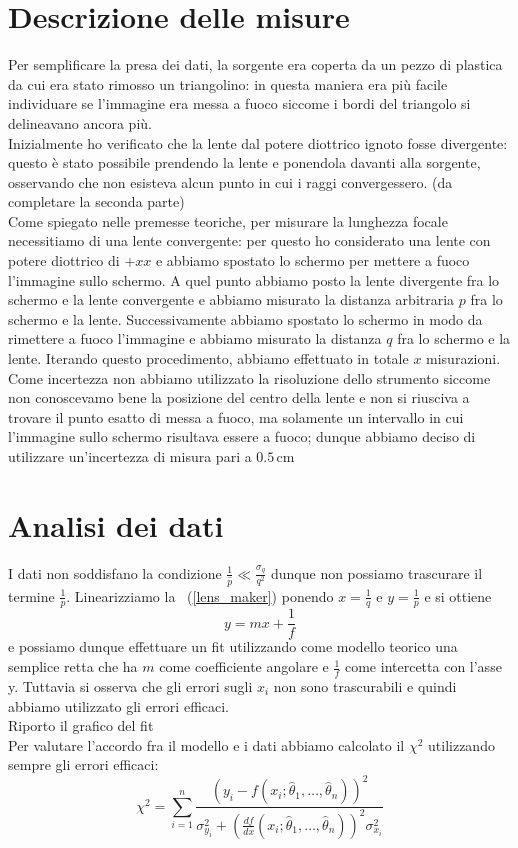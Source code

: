 \documentclass{article}
\begin{document}
	\section{Descrizione delle misure}
	Per semplificare la presa dei dati, la sorgente era coperta da un pezzo di plastica da cui era stato rimosso un triangolino: in questa maniera era più facile individuare se l'immagine era messa a fuoco siccome i bordi del triangolo si delineavano ancora più. \\
	Inizialmente ho verificato che la lente dal potere diottrico ignoto fosse divergente: questo è stato possibile prendendo la lente e ponendola davanti alla sorgente, osservando che non esisteva alcun punto in cui i raggi convergessero. (da completare la seconda parte) \\
	Come spiegato nelle premesse teoriche, per misurare la lunghezza focale necessitiamo di una lente convergente: per questo ho considerato una lente con potere diottrico di $+xx$ e abbiamo spostato lo schermo per mettere a fuoco l'immagine sullo schermo. A quel punto abbiamo posto la lente divergente fra lo schermo e la lente convergente e abbiamo misurato la distanza arbitraria $p$ fra lo schermo e la lente. Successivamente abbiamo spostato lo schermo in modo da rimettere a fuoco l'immagine e abbiamo misurato la distanza $q$ fra lo schermo e la lente. Iterando questo procedimento, abbiamo effettuato in totale $x$ misurazioni. \\
	Come incertezza non abbiamo utilizzato la risoluzione dello strumento siccome non conoscevamo bene la posizione del centro della lente e non si riusciva a trovare il punto esatto di messa a fuoco, ma solamente un intervallo in cui l'immagine sullo schermo risultava essere a fuoco; dunque abbiamo deciso di utilizzare un'incertezza di misura pari a $0.5 \, \si{\centi\meter}$
	\section{Analisi dei dati}
	I dati non soddisfano la condizione $\frac{1}{\hat{p}} \ll \frac{\sigma_q}{q^2}$ dunque non possiamo trascurare il termine $\frac{1}{p}$. Linearizziamo la ~(\ref{lens_maker}) ponendo $x = \frac{1}{q}$ e $y=\frac{1}{p}$ e si ottiene
	$$
		y = mx + \frac{1}{f}
	$$
	e possiamo dunque effettuare un fit utilizzando come modello teorico una semplice retta che ha $m$ come coefficiente angolare e $\frac{1}{f}$ come intercetta con l'asse y. Tuttavia si osserva che gli errori sugli $x_i$ non sono trascurabili e quindi abbiamo utilizzato gli errori efficaci. \\
	Riporto il grafico del fit \\
	
	Per valutare l'accordo fra il modello e i dati abbiamo calcolato il $\chi^2$ utilizzando sempre gli errori efficaci:
	\begin{equation}
		\chi^2 = \sum_{i=1}^n \frac{(y_i - f(x_i; \hat{\theta}_1, \ldots, \hat{\theta}_n))^2}{\sigma_{y_i}^2 + (\frac{df}{dx}(x_i; \hat{\theta}_1, \ldots, \hat{\theta}_n))^2 \sigma_{x_i}^2}
	\end{equation}
\end{document}
